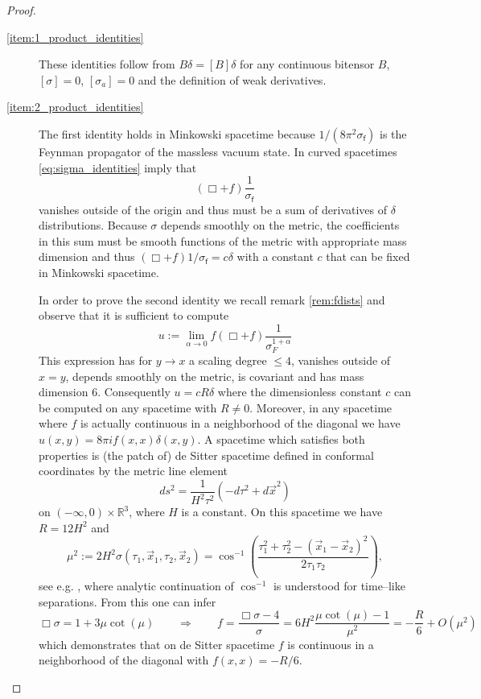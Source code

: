 \documentclass[11pt]{book}
\newcommand{\Rbb}{\mathbb{R}}
\newcommand{\fsf}{\mathsf{f}}
\theoremstyle{break}
\begin{document}
\begin{proof}
\begin{description}
\item[\ref{item:1_product_identities}] These identities follow from $B\delta=[B]\delta$ for any continuous bitensor $B$, $[\sigma]=0$, $[\sigma_a]=0$ and the definition of weak derivatives.
%
%
\item[\ref{item:2_product_identities}] The first identity holds in Minkowski spacetime because $1/(8\pi^2\sigma_\fsf)$ is the Feynman propagator of the massless vacuum state. In curved spacetimes \eqref{eq:sigma_identities} imply that
%
\begin{equation}
(\Box+f)\frac{1}{\sigma_\fsf}
\end{equation}
%
vanishes outside of the origin and thus must be a sum of derivatives of $\delta$ distributions. Because $\sigma$ depends smoothly on the metric, the coefficients in this sum must be smooth functions of the metric with appropriate mass dimension and thus $(\Box+f)1/\sigma_\fsf=c\delta$ with a constant $c$ that can be fixed in Minkowski spacetime.\par%
%
In order to prove the second identity we recall remark \ref{rem:fdists} and observe that it is sufficient to compute
%
\begin{equation*}
u:=\lim_{\alpha\to 0}f(\Box+f)\frac{1}{\sigma^{1+\alpha}_F} 
\end{equation*}
%
This expression has for $y\to x$ a scaling degree $\leq 4$, vanishes outside of $x=y$, depends smoothly on the metric, is covariant and has mass dimension $6$. Consequently $u=cR\delta$ where the dimensionless constant $c$ can be computed on any spacetime with $R\neq 0$. Moreover, in any spacetime where $f$ is actually continuous in a neighborhood of the diagonal we have $u(x,y)=8\pi i f(x,x) \delta(x,y)$. A spacetime which satisfies both properties is (the patch of) de Sitter spacetime defined in conformal coordinates by the metric line element 
%
\begin{equation*}
ds^2=\frac{1}{H^2\tau^2}\left(-d\tau^2 + d\vec{x}^2\right) 
\end{equation*}
%
on $(-\infty,0)\times\Rbb^3$, where $H$ is a constant. On this spacetime we have $R=12H^2$ and 
%
\begin{equation*}
\mu^2:=2 H^2 \sigma(\tau_1,\vec{x}_1,\tau_2,\vec{x}_2)=\cos^{-1}\left(\frac{\tau^2_1+\tau^2_2-(\vec{x}_1-\vec{x}_2)^2}{2\tau_1\tau_2}\right), 
\end{equation*}
%
see e.g. \cite{ALLEN_1985}, where analytic continuation of $\cos^{-1}$ is understood for time--like separations. From this one can infer 
%
$$
\Box \sigma = 1+3 \mu \cot (\mu) \qquad \Rightarrow \qquad f = \frac{\Box \sigma-4}{\sigma} = 6H^2 \frac{\mu \cot (\mu) - 1}{\mu^2}= -\frac{R}{6} + O(\mu^2)
$$
%
which demonstrates that on de Sitter spacetime $f$ is continuous in a neighborhood of the diagonal with $f(x,x)=-R/6$. 


\end{description}
\end{proof}
\end{document}
